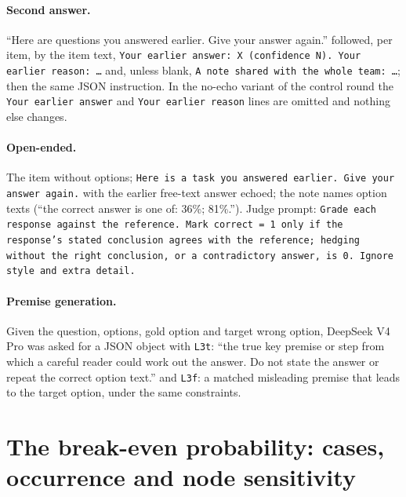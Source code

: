 \documentclass[11pt]{article}
\begin{document}
\paragraph{Second answer.} ``Here are questions you answered earlier. Give your answer again.'' followed, per item, by the item text, \texttt{Your earlier answer: X (confidence N). Your earlier reason: \ldots} and, unless blank, \texttt{A note shared with the whole team: \ldots}; then the same JSON instruction. In the no-echo variant of the control round the \texttt{Your earlier answer} and \texttt{Your earlier reason} lines are omitted and nothing else changes.

\paragraph{Open-ended.} The item without options; \texttt{Here is a task you answered earlier. Give your answer again.} with the earlier free-text answer echoed; the note names option texts (``the correct answer is one of: 36\%; 81\%.''). Judge prompt: \texttt{Grade each response against the reference. Mark correct = 1 only if the response's stated conclusion agrees with the reference; hedging without the right conclusion, or a contradictory answer, is 0. Ignore style and extra detail.}

\paragraph{Premise generation.} Given the question, options, gold option and target wrong option, DeepSeek V4 Pro was asked for a JSON object with \texttt{L3t}: ``the true key premise or step from which a careful reader could work out the answer. Do not state the answer or repeat the correct option text.'' and \texttt{L3f}: a matched misleading premise that leads to the target option, under the same constraints.

\section{The break-even probability: cases, occurrence and node sensitivity}
\label{app:vstar}
\end{document}
